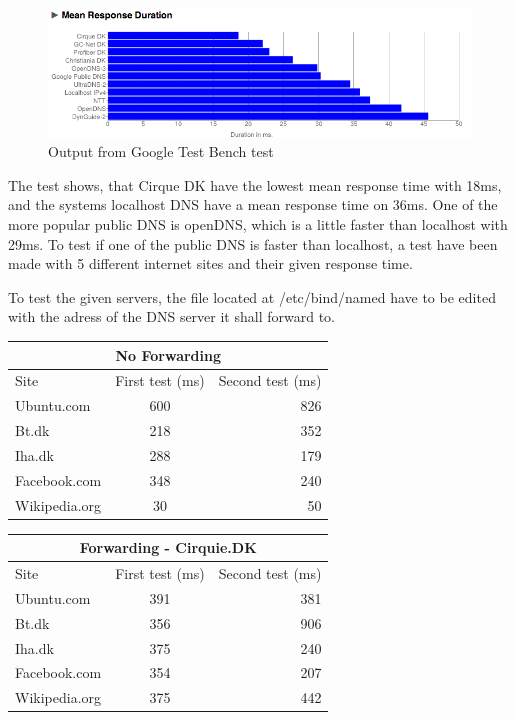 \documentclass[Preamble]{subfiles}
\begin{document}
\begin{figure}[hbtp]
\centering
\includegraphics[scale=0.5]{Figurer/NamebenchTest.png}
\caption{Output from Google Test Bench test}
\end{figure}

The test shows, that Cirque DK have the lowest mean response time with 18ms, and the systems localhost DNS have a mean response time on 36ms. One of the more popular public DNS is openDNS, which is a little faster than localhost with 29ms. To test if one of the public DNS is faster than localhost, a test have been made with 5 different internet sites and their given response time. 

To test the given servers, the file located at /etc/bind/named have to be edited with the adress of the DNS server it shall forward to. 


\begin{center}
  \begin{tabular}{ l | c  | r}
    \multicolumn{3}{c}{No Forwarding}  \\
	\hline Site & First test (ms) & Second test (ms) \\     
    \hline
    Ubuntu.com & 600 & 826  \\ \hline
    Bt.dk & 218 & 352  \\ \hline
	Iha.dk & 288 & 179 \\ \hline
	Facebook.com & 348 &	240 \\ \hline
	Wikipedia.org & 30 &	50 \\ \hline
  \end{tabular}
\end{center}

\begin{center}
  \begin{tabular}{ l | c  | r}
    \multicolumn{3}{c}{Forwarding - Cirquie.DK}  \\
	\hline Site & First test (ms) & Second test (ms) \\     
    \hline
    Ubuntu.com & 391 & 381  \\ \hline
    Bt.dk & 356 & 906  \\ \hline
	Iha.dk & 375 & 240 \\ \hline
	Facebook.com & 354 &	207 \\ \hline
	Wikipedia.org & 375 & 442 \\ \hline
  \end{tabular}
\end{center}
\end{document}
